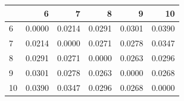 \begin{tabular}{lrrrrr}
\toprule
 & 6 & 7 & 8 & 9 & 10 \\
\midrule
6 & 0.0000 & 0.0214 & 0.0291 & 0.0301 & 0.0390 \\
7 & 0.0214 & 0.0000 & 0.0271 & 0.0278 & 0.0347 \\
8 & 0.0291 & 0.0271 & 0.0000 & 0.0263 & 0.0296 \\
9 & 0.0301 & 0.0278 & 0.0263 & 0.0000 & 0.0268 \\
10 & 0.0390 & 0.0347 & 0.0296 & 0.0268 & 0.0000 \\
\bottomrule
\end{tabular}
